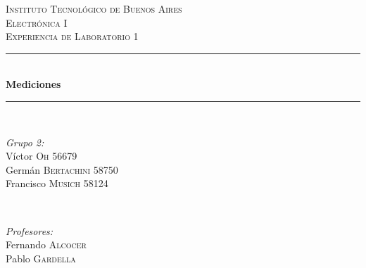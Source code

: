 \begin{titlepage}
    \newcommand{\HRule}{\rule{\linewidth}{0.5mm}}
    \center
    \textsc{\LARGE Instituto Tecnológico de Buenos Aires}\\[1.2cm]
    \textsc{\Large Electrónica I}\\[0.5cm]
    \textsc{\large Experiencia de Laboratorio 1}\\[0.5cm]
    
    \HRule \\[0.4cm]
    { \huge \bfseries  Mediciones}\\[0.4cm] %
    \HRule \\[1.5cm]
    
    
    \begin{minipage}{0.4\textwidth}
    \begin{flushleft} \large
    \emph{Grupo 2:}\\
    Víctor \textsc{Oh} 56679\\
    Germán \textsc{Bertachini}  58750\\
    Francisco \textsc{Musich} 58124\\
    \end{flushleft}
    \end{minipage}
    ~
    \begin{minipage}{0.4\textwidth}
    \begin{flushright} \large
    \emph{Profesores:} \\
    Fernando \textsc{Alcocer}\\
    Pablo \textsc{Gardella}\\
    \end{flushright}
    \end{minipage}\\[4cm]
    
    \vfill %
\end{titlepage}